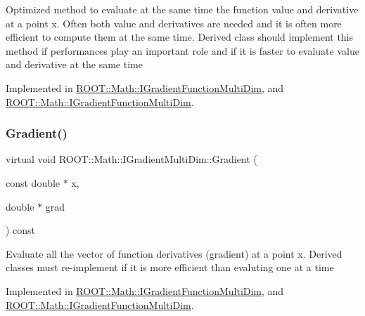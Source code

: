 Optimized method to evaluate at the same time the function value and derivative at a point x. Often both value and derivatives are needed and it is often more efficient to compute them at the same time. Derived class should implement this method if performances play an important role and if it is faster to evaluate value and derivative at the same time 

Implemented in \mbox{\hyperlink{classROOT_1_1Math_1_1IGradientFunctionMultiDim_a58cefd2806ec7b9d389911800ed60386}{R\+O\+O\+T\+::\+Math\+::\+I\+Gradient\+Function\+Multi\+Dim}}, and \mbox{\hyperlink{classROOT_1_1Math_1_1IGradientFunctionMultiDim_a58cefd2806ec7b9d389911800ed60386}{R\+O\+O\+T\+::\+Math\+::\+I\+Gradient\+Function\+Multi\+Dim}}.

\mbox{\label{classROOT_1_1Math_1_1IGradientMultiDim_ac5785e2df4fa36061bf9ddbb9ce4dde0}} 
\subsubsection{\texorpdfstring{Gradient()}{Gradient()}\hspace{0.1cm}{\footnotesize\ttfamily [1/2]}}
{\footnotesize\ttfamily virtual void R\+O\+O\+T\+::\+Math\+::\+I\+Gradient\+Multi\+Dim\+::\+Gradient (\begin{DoxyParamCaption}\item[{const double $\ast$}]{x,  }\item[{double $\ast$}]{grad }\end{DoxyParamCaption}) const\hspace{0.3cm}{\ttfamily [pure virtual]}}

Evaluate all the vector of function derivatives (gradient) at a point x. Derived classes must re-\/implement if it is more efficient than evaluting one at a time 

Implemented in \mbox{\hyperlink{classROOT_1_1Math_1_1IGradientFunctionMultiDim_ab65a713d2637c69b334d2119ef4f0e26}{R\+O\+O\+T\+::\+Math\+::\+I\+Gradient\+Function\+Multi\+Dim}}, and \mbox{\hyperlink{classROOT_1_1Math_1_1IGradientFunctionMultiDim_ab65a713d2637c69b334d2119ef4f0e26}{R\+O\+O\+T\+::\+Math\+::\+I\+Gradient\+Function\+Multi\+Dim}}.

\mbox{\label{classROOT_1_1Math_1_1IGradientMultiDim_ac5785e2df4fa36061bf9ddbb9ce4dde0}} 
